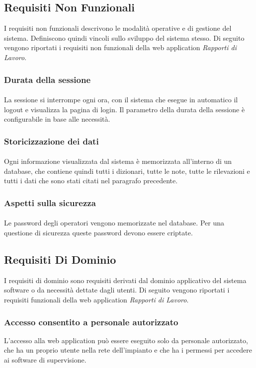   \subsection{Requisiti Non Funzionali}
  I requisiti non funzionali descrivono le modalità operative e di gestione del sistema. Definiscono quindi vincoli 
  sullo sviluppo del sistema stesso. Di seguito vengono riportati i requisiti non funzionali della web application \textit{Rapporti di Lavoro}.
  
  \subsubsection{Durata della sessione}
  \paragraph{}
  La sessione si interrompe ogni ora, con il sistema che esegue in automatico il logout e visualizza 
  la pagina di login. Il parametro della durata della sessione è configurabile in base alle necessità.


  \subsubsection{Storicizzazione dei dati}
  \paragraph{}
  Ogni informazione visualizzata dal sistema è memorizzata all'interno di un database, che contiene quindi 
  tutti i dizionari, tutte le note, tutte le rilevazioni e tutti i dati che sono stati citati nel paragrafo precedente.

  \subsubsection{Aspetti sulla sicurezza}
  \paragraph{}
  Le password degli operatori vengono memorizzate nel database. Per una questione di sicurezza queste password 
  devono essere criptate. 

  \subsection{Requisiti Di Dominio}
  I requisiti di dominio sono requisiti derivati dal dominio applicativo del sistema software o da necessità
  dettate dagli utenti. Di seguito vengono riportati i requisiti funzionali della web application \textit{Rapporti di Lavoro}.
  
  \subsubsection{Accesso consentito a personale autorizzato}
  L'accesso alla web application può essere eseguito solo da personale autorizzato, che ha un proprio utente 
  nella rete dell'impianto e che ha i permessi per accedere ai software di supervisione.